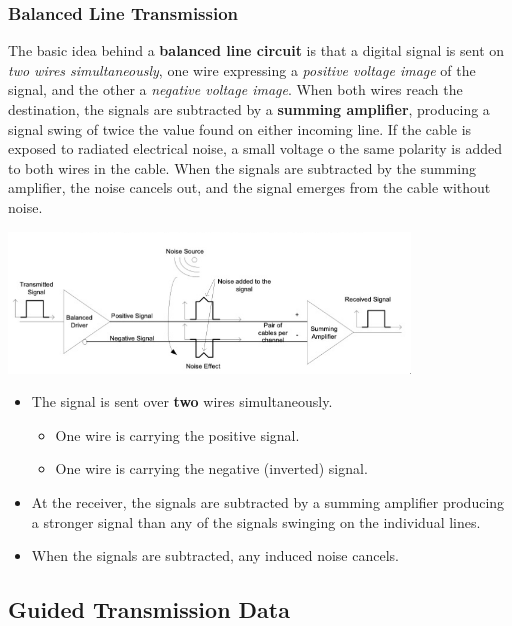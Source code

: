 \documentclass[11pt]{article}
\begin{document}
\subsubsection{Balanced Line Transmission}
The basic idea behind a \textbf{balanced line circuit} is that a digital signal is sent on \textit{two wires simultaneously},
one wire expressing a \textit{positive voltage image} of the signal, and the other a \textit{negative voltage image}.
When both wires reach the destination, the signals are subtracted by a \textbf{summing amplifier}, producing a signal swing of 
twice the value found on either incoming line. 
If the cable is exposed to radiated electrical noise, a small voltage o the same polarity is added to both wires in the cable. 
When the signals are subtracted by the summing amplifier, the noise cancels out, and the signal emerges from the cable without noise. 

\begin{center}
    \includegraphics[width=0.8\textwidth]{ballinetrans.png}
\end{center}
\begin{itemize}
    \item   The signal is sent over \textbf{two} wires simultaneously. 
            \begin{itemize}
                \item   One wire is carrying the positive signal. 
                \item   One wire is carrying the negative (inverted) signal. 
            \end{itemize}
    \item   At the receiver, the signals are subtracted by a summing amplifier producing a stronger signal than any of the signals 
            swinging on the individual lines. 
    \item   When the signals are subtracted, any induced noise cancels. 
\end{itemize}

\subsection{Guided Transmission Data} 
\end{document}
